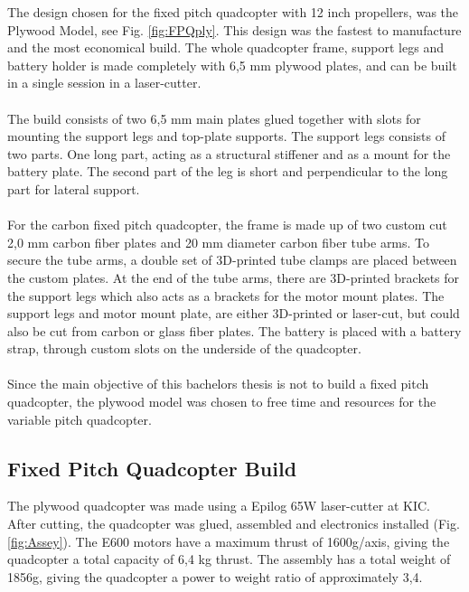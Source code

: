 \noindent
The design chosen for the fixed pitch quadcopter with 12 inch propellers, was the Plywood Model, see Fig. \ref{fig:FPQply}. This design was the fastest to manufacture and the most economical build. The whole quadcopter frame, support legs and battery holder is made completely with 6,5 mm plywood plates, and can be built in a single session in a laser-cutter. 
\\\\
The build consists of two 6,5 mm main plates glued together with slots for mounting the support legs and top-plate supports. The support legs consists of two parts. One long part, acting as a structural stiffener and as a mount for the battery plate. The second part of the leg is short and perpendicular to the long part for lateral support.
\\\\
For the carbon fixed pitch quadcopter, the frame is made up of two custom cut 2,0 mm carbon fiber plates and 20 mm diameter carbon fiber tube arms. To secure the tube arms, a double set of 3D-printed tube clamps are placed between the custom plates. At the end of the tube arms, there are 3D-printed brackets for the support legs which also acts as a brackets for the motor mount plates. The support legs and motor mount plate, are either 3D-printed or laser-cut, but could also be cut from carbon or glass fiber plates. The battery is placed with a battery strap, through custom slots on the underside of the quadcopter.
\\\\
Since the main objective of this bachelors thesis is not to build a fixed pitch quadcopter, the plywood model was chosen to free time and resources for the variable pitch quadcopter.

\subsection{Fixed Pitch Quadcopter Build}

The plywood quadcopter was made using a Epilog 65W laser-cutter at KIC. After cutting, the quadcopter was glued, assembled and electronics installed (Fig. \ref{fig:Assey}). The E600 motors have a maximum thrust of 1600g/axis, giving the quadcopter a total capacity of 6,4 kg thrust. The assembly has a total weight of 1856g, giving the quadcopter a power to weight ratio of approximately 3,4.

